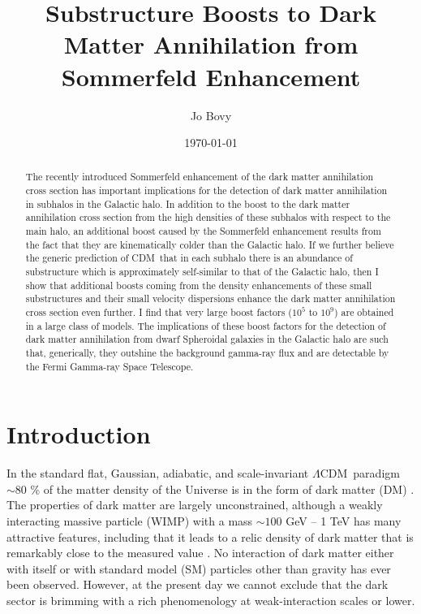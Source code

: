 \documentclass[aps,prd,twocolumn,amsmath,amssymb,floatfix,nofootinbib,10pt]{revtex4}
\newcommand{\CDM}{CDM}
\newcommand{\LCDM}{\ensuremath{\Lambda}\CDM}
\newcommand{\DM}{DM}
\newcommand{\SM}{SM}
\begin{document}
\title{Substructure Boosts to Dark Matter Annihilation from Sommerfeld Enhancement}
\author{Jo Bovy} 

\date{\today}

\begin{abstract}
The recently introduced Sommerfeld enhancement of the dark matter
annihilation cross section has important implications for the
detection of dark matter annihilation in subhalos in the Galactic
halo. In addition to the boost to the dark matter annihilation cross
section from the high densities of these subhalos with respect to the
main halo, an additional boost caused by the Sommerfeld enhancement
results from the fact that they are kinematically colder than the
Galactic halo. If we further believe the generic prediction of \CDM\
that in each subhalo there is an abundance of substructure which is
approximately self-similar to that of the Galactic halo, then I show
that additional boosts coming from the density enhancements of these
small substructures and their small velocity dispersions enhance the
dark matter annihilation cross section even further. I find that very
large boost factors ($10^5$ to $10^9$) are obtained in a large class
of models. The implications of these boost factors for the detection
of dark matter annihilation from dwarf Spheroidal galaxies in the
Galactic halo are such that, generically, they outshine the background
gamma-ray flux and are detectable by the Fermi Gamma-ray Space
Telescope.
\end{abstract}

\maketitle

\section{Introduction}
In the standard flat, Gaussian, adiabatic, and scale-invariant \LCDM\
paradigm $\sim\!80$ \% of the matter density of the Universe is in the
form of dark matter (\DM) \cite{2008arXiv0803.0547K}. The properties
of dark matter are largely unconstrained, although a weakly
interacting massive particle (WIMP) with a mass $\sim\!100$ GeV -- 1
TeV has many attractive features, including that it leads to a relic
density of dark matter that is remarkably close to the measured value
\cite{1996PhR...267..195J}. No interaction of dark matter either with
itself or with standard model (\SM) particles other than gravity has
ever been observed. However, at the present day we cannot exclude that
the dark sector is brimming with a rich phenomenology at
weak-interaction scales or lower.
\end{document}
